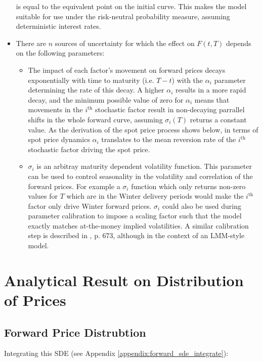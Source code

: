 \documentclass{article}
\begin{document}
\begin{itemize}
    is equal to the equivalent point on the initial curve. This makes the model suitable
    for use under the risk-neutral probability measure, assuming deterministic interest
    rates.
    \item There are $n$ sources of uncertainty for which the effect on $F(t, T)$
    depends on the following parameters:
    \begin{itemize}
        \item The impact of each factor's movement on forward prices decays exponentially
        with time to maturity (i.e. $T-t$) with the $\alpha_i$ parameter determining the
        rate of this decay. A higher $\alpha_i$ results in a more rapid decay, and the minimum
        possible value of zero for $\alpha_i$ means that movements in the $i^\text{th}$ 
        stochastic factor result in 
        non-decaying parrallel shifts in the whole forward curve, assuming $\sigma_i(T)$ 
        returns a constant value. As the derivation of the spot price process shows
        below, in terms of spot price dynamics $\alpha_i$ translates to the mean reversion 
        rate of the $i^\text{th}$ stochastic factor driving the spot price.
        \item $\sigma_i$ is an arbitray maturity dependent volatility function. This parameter
        can be used to control seasonality in the volatility and correlation of the forward
        prices. For example a $\sigma_i$ function which only returns non-zero values for $T$
        which are in the Winter delivery periods would make the $i^\text{th}$ factor only
        drive Winter forward prices. $\sigma_i$ could also be used during parameter calibration
        to impose a scaling factor such that the model exactly matches at-the-money implied
        volatilities. A similar calibration step is described in \cite{Rebonato}, p. 673, 
        although in the context of an LMM-style model.
    \end{itemize}
\end{itemize}

\section{Analytical Result on Distribution of Prices}
\subsection{Forward Price Distrubtion}
Integrating this SDE (see Appendix \ref{appendix:forward_sde_integrate}):
\end{document}
